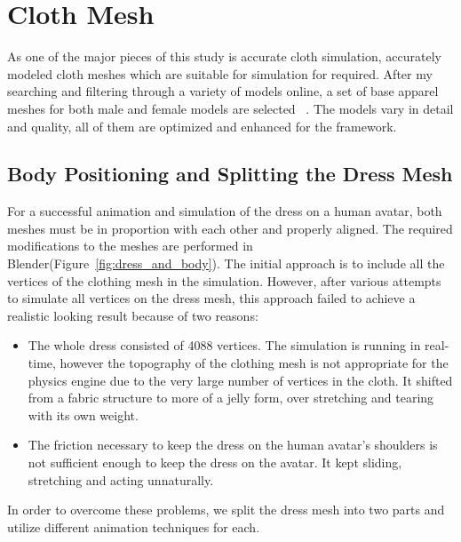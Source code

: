 \section{Cloth Mesh}
\label{section_cloth_mesh}

As one of the major pieces of this study is accurate cloth simulation, accurately modeled cloth meshes which are suitable for simulation for required. After my searching and filtering through a variety of models online, a set of base apparel meshes for both male and female models are selected ~\cite{LadyJewell2012, 3dregenerator2013,Axel2013,Borodin2013,PS3D2013,Alperin2013}. The models vary in detail and quality, all of them are optimized and enhanced for the framework. 

\subsection{Body Positioning and Splitting the Dress Mesh}

For a successful animation and simulation of the dress on a human avatar, both meshes must be in proportion with each other and properly aligned. The required modifications to the meshes are performed in Blender(Figure~\ref{fig:dress_and_body}). The initial approach is to include all the vertices of the clothing mesh in the simulation. However, after various attempts to simulate all vertices on the dress mesh, this approach failed to achieve a realistic looking result because of two reasons:
\begin{itemize}
\item The whole dress consisted of 4088 vertices. The simulation is running in real-time, however the topography of the clothing mesh is not appropriate for the physics engine due to the very large number of vertices in the cloth. It shifted from a fabric structure to more of a jelly form, over stretching and tearing with its own weight.
\item The friction necessary to keep the dress on the human avatar's shoulders is not sufficient enough to keep the dress on the avatar. It kept sliding, stretching and acting unnaturally.
\end{itemize}

In order to overcome these problems, we split the dress mesh into two parts and utilize different animation techniques for each.

